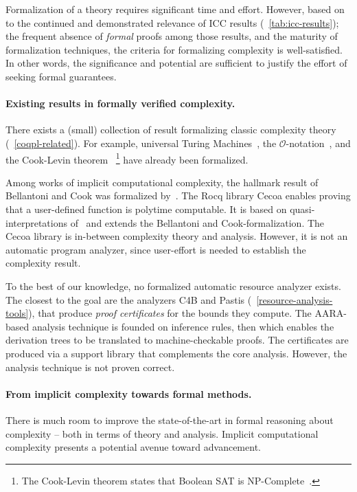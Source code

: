 Formalization of a theory requires significant time and effort.
However, based on to the continued and demonstrated relevance of ICC results (\cf~\autoref{tab:icc-results});
the frequent absence of \emph{formal} proofs among those results, and the maturity of formalization techniques, the criteria for formalizing complexity is well-satisfied.
In other words, the significance and potential are sufficient to justify the effort of seeking formal guarantees.

\paragraph*{Existing results in formally verified complexity.}
There exists a (small) collection of result formalizing classic complexity theory (\cf~\autoref{coqpl-related}).
For example, universal Turing Machines~\cite{forster2020}, the \(\mathcal{O}\)-notation~\cite{gueneau2018},
and the Cook-Levin theorem~\cite{gaher2021}%
\footnote{The Cook-Levin theorem states that Boolean SAT is NP-Complete~\cite{cook1971, levin1973}.}
have already been formalized.

Among works of implicit computational complexity, the hallmark result of Bellantoni and Cook was formalized by~\textcite{heraud2011}.
The Rocq library Cecoa enables proving that a user-defined function is polytime computable.
It is based on quasi-interpretations of~\textcite{marion2000} and extends the Bellantoni and Cook-formalization.
The Cecoa library is in-between complexity theory and analysis.
However, it is not an automatic program analyzer, since user-effort is needed to establish the complexity result.

To the best of our knowledge, no formalized automatic resource analyzer exists.
The closest to the goal are the analyzers C4B and Pastis (\cf~\autoref{resource-analysis-tools}),
that produce \emph{proof certificates} for the bounds they compute.
The AARA-based analysis technique is founded on inference rules, then which enables the derivation trees to be translated to machine-checkable proofs.
The certificates are produced via a support library that complements the core analysis.
However, the analysis {technique} is not proven correct.

\paragraph*{From implicit complexity towards formal methods.}
There is much room to improve the state-of-the-art in formal reasoning about complexity -- both in terms of theory and analysis.
Implicit computational complexity presents a potential avenue toward advancement.

